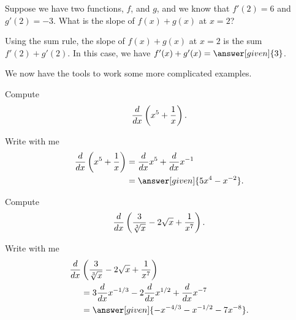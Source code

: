 \documentclass{ximera}
\begin{document}
\begin{example}
  Suppose we have two functions, $f$, and $g$, and we know that $f'(2) = 6$ and $g'(2) = -3$.
  What is the slope of $f(x) + g(x)$ at $x = 2$?
  \begin{explanation}
  	Using the sum rule, the slope of $f(x) + g(x)$ at $x = 2$ is the sum $f'(2) + g'(2)$.   In 
	this case, we have $f'(x) + g'(x) = \answer[given]{3}$.
  \end{explanation}
\end{example} 


We now have the tools to work some more complicated examples. 


\begin{example}
Compute
\[
\frac{d}{dx} \left( x^5+\frac{1}{x}\right).
\] 
\begin{explanation}
Write with me
\begin{align*}
\ddx \left(x^5+\frac{1}{x}\right) &= \ddx x^5 + \ddx x^{-1} \\
&=\answer[given]{5x^4 - x^{-2}}.
\end{align*}
\end{explanation}
\end{example}

\begin{example}
Compute
\[
\frac{d}{dx} \left(\frac{3}{\sqrt[3]{x}}-2\sqrt{x}+\frac{1}{x^7}\right).
\]
\begin{explanation}
Write with me
\begin{align*}
  \ddx &\left(\frac{3}{\sqrt[3]{x}}-2\sqrt{x}+\frac{1}{x^7}\right)\\
  &= 3\ddx x^{-1/3} -2\ddx x^{1/2}+\ddx x^{-7}\\
  &=\answer[given]{-x^{-4/3} - x^{-1/2}-7x^{-8}}.
\end{align*}
\end{explanation}
\end{example}
\end{document}
